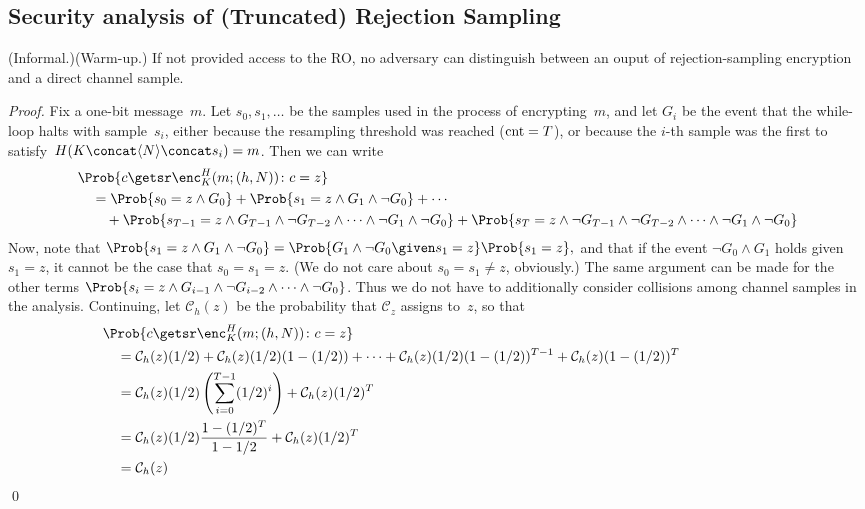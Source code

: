 \subsection{Security analysis of (Truncated) Rejection Sampling}
\begin{lemma} (Informal.)(Warm-up.) \rm If not provided access to the RO, no adversary can distinguish between an ouput of rejection-sampling encryption and a direct channel sample.
\end{lemma}
\begin{proof}
Fix a one-bit message~$m$.  
Let $s_0,s_1,\ldots$ be the samples used in the process of
encrypting~$m$, and let $G_i$ be the event that the while-loop halts with sample~$s_i$, either because the resampling threshold was reached ($\mathrm{cnt}=T$), or because the $i$-th sample was the first to satisfy~$H(K \concat \langle N \rangle \concat s_i)=m$.  Then we can write
\begin{align*}
&\Prob{c\getsr\enc^H_K(m;(h,N)) \colon c=z}\\
&\quad=\Prob{s_0=z \wedge G_0} + \Prob{s_1=z \wedge G_1 \wedge  \neg G_0} + \cdots \\
&\quad\quad+ \Prob{s_{T-1}=z \wedge  G_{T-1} \wedge \neg G_{T-2} \wedge \cdots  \wedge \neg G_1 \wedge \neg G_0}
+ \Prob{s_T=z \wedge \neg G_{T-1} \wedge \neg G_{T-2} \wedge \cdots \wedge \neg G_1 \wedge \neg G_0}
\end{align*}
Now, note that 
$
\Prob{s_1=z \wedge G_1 \wedge \neg G_0 } = \Prob{G_1 \wedge \neg G_0 \given s_1=z}\Prob{s_1=z},
$
and that if the event $\neg G_0 \wedge G_1$ holds given $s_1=z$, it cannot be the case that $s_0=s_1=z$.  (We do not care about $s_0=s_1\neq z$, obviously.)  The same argument can be made for the other terms $\Prob{s_i=z \wedge G_{i-1} \wedge \neg G_{i-2}\wedge \cdots \wedge \neg G_0 }$. Thus we do not have to additionally consider collisions among channel samples in the analysis.  Continuing, let $\mathcal{C}_h(z)$ be the probability that $\mathcal{C}_z$ assigns to~$z$, so that
\begin{align*}
&\Prob{c\getsr\enc^H_K(m;(h,N)) \colon c=z}\\
&\quad=\mathcal{C}_h(z)(1/2) + \mathcal{C}_h(z)(1/2)(1-(1/2)) + \cdots + \mathcal{C}_h(z)(1/2)(1-(1/2))^{T-1} +\mathcal{C}_h(z)(1-(1/2))^{T} \phantom{~~~~~~~~~~~~~~~~~~~~}\\
&\quad= \mathcal{C}_h(z)(1/2)\left(\sum_{i=0}^{T-1}(1/2)^i \right) + \mathcal{C}_h(z)(1/2)^{T}\\
&\quad=\mathcal{C}_h(z)(1/2)\frac{1-(1/2)^T}{1-1/2} + \mathcal{C}_h(z)(1/2)^{T}\\ 
&\quad=\mathcal{C}_h(z) 
\end{align*}
\hfill\qed
\end{proof}
